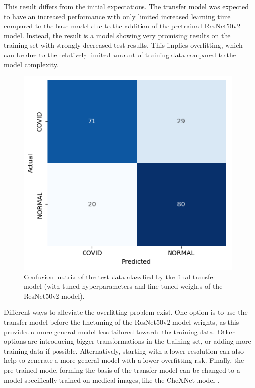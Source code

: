\documentclass[conference]{IEEEtran}
\begin{document}
This result differs from the initial expectations. The transfer model was expected to have an increased performance with only limited increased learning time compared to the base model due to the addition of the pretrained ResNet50v2 model. Instead, the result is a model showing very promising results on the training set with strongly decreased test results. This implies overfitting, which can be due to the relatively limited amount of training data compared to the model complexity. 

\begin{figure}[H] \centering \includegraphics[width=0.9\columnwidth]{fig_task3_confusionmatrix.png} \caption{Confusion matrix of the test data classified by the final transfer model (with tuned hyperparameters and fine-tuned weights of the ResNet50v2 model).} \label{fig:task3_confusionmatrix} 
\end{figure}

Different ways to alleviate the overfitting problem exist. One option is to use the transfer model before the finetuning of the ResNet50v2 model weights, as this provides a more general model less tailored towards the training data. Other options are introducing bigger transformations in the training set, or adding more training data if possible. Alternatively, starting with a lower resolution can also help to generate a more general model with a lower overfitting risk. Finally, the pre-trained model forming the basis of the transfer model can be changed to a model specifically trained on medical images, like the CheXNet model \cite{CHEXNET}.
\end{document}
